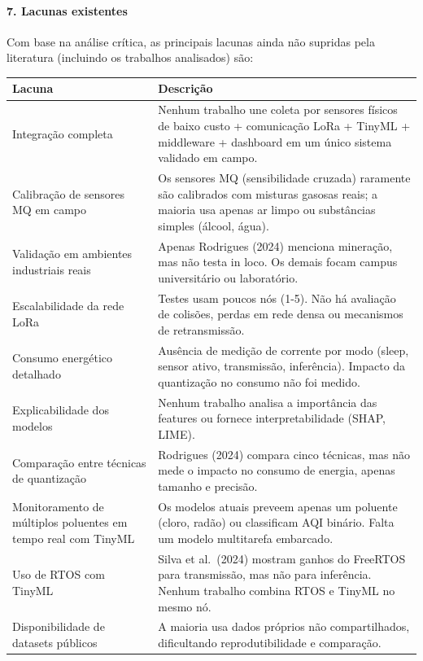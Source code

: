 \paragraph*{7. Lacunas existentes}

Com base na análise crítica, as principais lacunas ainda não supridas pela literatura (incluindo os trabalhos analisados) são:

\begin{table}[H]
\centering
\small
\begin{tabularx}{\textwidth}{|p{3.5cm}|X|}
\hline
\textbf{Lacuna} & \textbf{Descrição} \\
\hline
Integração completa & Nenhum trabalho une coleta por sensores físicos de baixo custo + comunicação LoRa + TinyML + middleware + dashboard em um único sistema validado em campo. \\
\hline
Calibração de sensores MQ em campo & Os sensores MQ (sensibilidade cruzada) raramente são calibrados com misturas gasosas reais; a maioria usa apenas ar limpo ou substâncias simples (álcool, água). \\
\hline
Validação em ambientes industriais reais & Apenas Rodrigues (2024) menciona mineração, mas não testa in loco. Os demais focam campus universitário ou laboratório. \\
\hline
Escalabilidade da rede LoRa & Testes usam poucos nós (1-5). Não há avaliação de colisões, perdas em rede densa ou mecanismos de retransmissão. \\
\hline
Consumo energético detalhado & Ausência de medição de corrente por modo (sleep, sensor ativo, transmissão, inferência). Impacto da quantização no consumo não foi medido. \\
\hline
Explicabilidade dos modelos & Nenhum trabalho analisa a importância das features ou fornece interpretabilidade (SHAP, LIME). \\
\hline
Comparação entre técnicas de quantização & Rodrigues (2024) compara cinco técnicas, mas não mede o impacto no consumo de energia, apenas tamanho e precisão. \\
\hline
Monitoramento de múltiplos poluentes em tempo real com TinyML & Os modelos atuais preveem apenas um poluente (cloro, radão) ou classificam AQI binário. Falta um modelo multitarefa embarcado. \\
\hline
Uso de RTOS com TinyML & Silva et al.\ (2024) mostram ganhos do FreeRTOS para transmissão, mas não para inferência. Nenhum trabalho combina RTOS e TinyML no mesmo nó. \\
\hline
Disponibilidade de datasets públicos & A maioria usa dados próprios não compartilhados, dificultando reprodutibilidade e comparação. \\
\hline
\end{tabularx}
\end{table}

